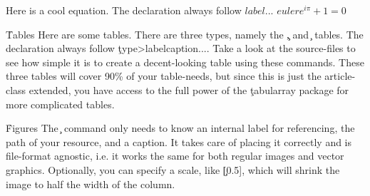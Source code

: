 \documentclass[twocolumn]{paper}
\begin{document}
Here is a cool equation. The declaration always follow \c{\begin{math}{label} ... \end{math}}
\begin{math}{euler}
    e^{i\pi}+1=0
\end{math}

\h{Tables}
Here are some tables. There are three types, namely the \c{\cols, \rows} and \c{\grid} tables. The declaration always follow \c{\<type>{label}{caption}{...}}. Take a look at the source-files to see how simple it is to create a decent-looking table using these commands. These three tables will cover 90\% of your table-needs, but since this is just the article-class extended, you have access to the full power of the \c{tabularray}\cite{tabularray} package for more complicated tables.




\h{Figures}
The \c{} command only needs to know an internal label for referencing, the path of your resource, and a caption. It takes care of placing it correctly and is file-format agnostic, i.e. it works the same for both regular images and vector graphics. Optionally, you can specify a scale, like \c{[0.5]}, which will shrink the image to half the width of the column.

\end{document}

